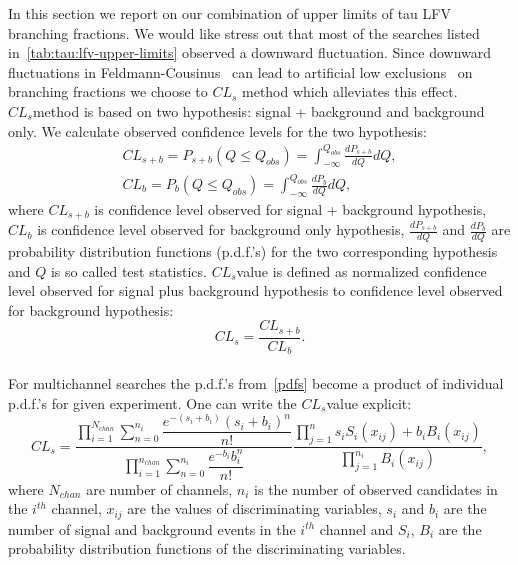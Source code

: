 \newcommand{\fixme}{\color{red} FIXME!}

\label{sec:tau:lfv_com}
\def\cls{$CL_s$}

In this section we report on our combination of upper limits of tau LFV branching fractions. We would like stress out that most of the searches listed in~\ref{tab:tau:lfv-upper-limits} observed a downward fluctuation. Since downward fluctuations in Feldmann-Cousinus~\cite{PhysRevD.57.3873} can lead to artificial low exclusions~\cite{PhysRevD.86.010001} on branching fractions we choose to \cls \cite{Mistlberger:2012rs} method which alleviates this effect. \\
\cls method is based on two hypothesis: signal + background and background only. We calculate observed confidence levels for the two hypothesis:
\begin{align}
CL_{s+b} = P_{s+b}(Q \leq Q_{obs}) = \int_{- \infty}^{Q_{obs}} \frac{dP_{s+b}}{dQ} dQ,\\
CL_{b} = P_{b}(Q \leq Q_{obs}) = \int_{- \infty}^{Q_{obs}} \frac{dP_{b}}{dQ} dQ,
\label{pdfs}
\end{align}
where $CL_{s+b}$ is confidence level observed for signal + background hypothesis, $CL_{b}$ is confidence level observed for background only hypothesis, $\frac{dP_{s+b}}{dQ}$ and $\frac{dP_{b}}{dQ}$ are probability distribution functions (p.d.f.'s) for the two corresponding hypothesis and $Q$ is so called test statistics. \cls value is defined as normalized confidence level observed for signal plus background hypothesis to confidence level observed for background hypothesis:
\begin{equation}
CL_s=\dfrac{CL_{s+b}}{CL_{b}}.
\end{equation}\\
For multichannel searches the p.d.f.'s from~\ref{pdfs} become a product of individual p.d.f.'s for given experiment. One can write the \cls value explicit:
\begin{equation}
CL_s = \dfrac{\prod_{i=1}^{N_{chan}}\sum_{n=0}^{n_i} \dfrac{e^{-(s_i+b_i)} (s_i+b_i)^{n}}{n!} }{\prod_{i=1}^{n_{chan}}  \sum_{n=0}^{n_i} \dfrac{e^{-b_i} b_i^{n}}{n!}}    \dfrac{\prod_{j=1}^{n} s_iS_i(x_{ij})+b_iB_i(x_{ij})}{\prod_{j=1}^{n_i}B_i(x_{ij})},
\end{equation}
where $N_{chan}$ are number of channels, $n_i$ is the number of observed candidates in the $i^{th}$ channel, $x_{ij}$ are the values of discriminating variables, $s_i$ and $b_i$ are the number of signal and background events in the $i^{th}$ channel and $S_i$, $B_i$ are the probability distribution functions of the discriminating variables. \\
